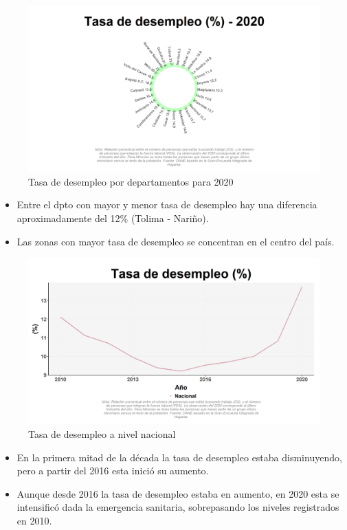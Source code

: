     \begin{figure}[H]
        \caption{Tasa de desempleo por departamentos para 2020 \label{map_result_2} }
        \begin{center}
        \includegraphics[width=\textwidth,keepaspectratio]{img/var_47_static.png}
        \end{center}
    \end{figure}
            \begin{itemize}
                \item Entre el dpto con mayor y menor tasa de desempleo hay una diferencia aproximadamente del 12\% (Tolima - Nariño).
                \item Las zonas con mayor tasa de desempleo se concentran en el centro del país.
                \end{itemize}

    \begin{figure}[H]
        \caption{Tasa de desempleo a nivel nacional \label{map_result_2} }
        \begin{center}
        \includegraphics[width=\textwidth,keepaspectratio]{img/var_50_trend.png}
        \end{center}
    \end{figure}
            \begin{itemize}
                \item En la primera mitad de la década la tasa de desempleo estaba disminuyendo, pero a partir del 2016 esta inició su aumento.
                \item Aunque desde 2016 la tasa de desempleo estaba en aumento, en 2020 esta se intensificó dada la emergencia sanitaria, sobrepasando los niveles registrados en 2010.
                \end{itemize}

